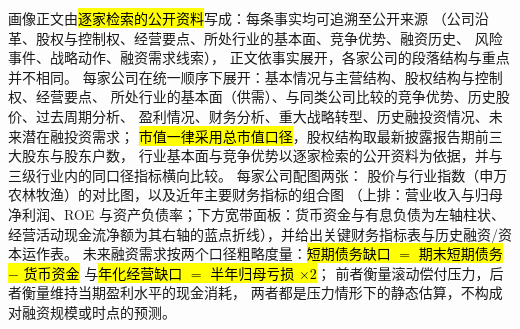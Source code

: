 画像正文由\hl{逐家检索的公开资料}写成：每条事实均可追溯至公开来源
（公司沿革、股权与控制权、经营要点、所处行业的基本面、竞争优势、融资历史、
风险事件、战略动作、融资需求线索），
正文依事实展开，各家公司的段落结构与重点并不相同。
每家公司在统一顺序下展开：基本情况与主营结构、股权结构与控制权、经营要点、
所处行业的基本面（供需）、与同类公司比较的竞争优势、历史股价、过去周期分析、
盈利情况、财务分析、重大战略转型、历史融投资情况、未来潜在融投资需求；
\hl{市值一律采用总市值口径}，股权结构取最新披露报告期前三大股东与股东户数，
行业基本面与竞争优势以逐家检索的公开资料为依据，并与三级行业内的同口径指标横向比较。
每家公司配图两张：
股价与行业指数（申万农林牧渔）的对比图，以及近年主要财务指标的组合图
（上排：营业收入与归母净利润、ROE 与资产负债率；下方宽带面板：货币资金与有息负债为左轴柱状、
经营活动现金流净额为其右轴的蓝点折线），并给出关键财务指标表与历史融资/资本运作表。
未来融资需求按两个口径粗略度量：\hl{短期债务缺口 $=$ 期末短期债务 $-$ 货币资金}
与\hl{年化经营缺口 $=$ 半年归母亏损 $\times 2$}；
前者衡量滚动偿付压力，后者衡量维持当期盈利水平的现金消耗，
两者都是压力情形下的静态估算，不构成对融资规模或时点的预测。


